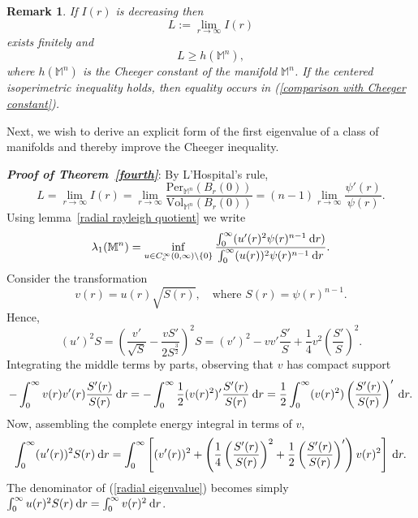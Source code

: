 \documentclass[a4paper,11pt,reqno]{amsart}
\renewcommand\eqref[1]{(\ref{#1})}
\theoremstyle{plain}
\newtheorem{remark}{Remark}[section]
\numberwithin{equation}{section} \allowdisplaybreaks
\newcommand{\m}{\mathbb{M}^n}
\newcommand{\dr}{\:{\rm d}r}
\begin{document}
\begin{remark}
\rm
    If $I(r)$ is decreasing then
    \begin{equation*}
        L:=\lim_{r \to \infty}I(r)
    \end{equation*}
    exists finitely and 
    \begin{equation}\label{comparison with Cheeger constant}
        L \geq h(\m),
    \end{equation}
    where $h(\m)$ is the Cheeger constant of the manifold $\m$. If the centered isoperimetric inequality holds, then equality occurs in \eqref{comparison with Cheeger constant}. \rm
\end{remark}

\medskip


Next, we wish to derive an explicit form of the first eigenvalue of a class of manifolds and thereby improve the Cheeger inequality. 


   \textit{\textbf{Proof of Theorem~\ref{fourth}}}: By L'Hospital's rule,
    \begin{equation*}
        L=\lim_{r \to \infty}I(r)=\lim_{r \to \infty}\frac{\text{Per}_{\m}(B_r(0))}{\text{Vol}_{\m}(B_r(0))}=(n-1)\lim_{r \to \infty}\frac{\psi'(r)}{\psi(r)}.
    \end{equation*}
Using lemma~\ref{radial rayleigh quotient} we write
\begin{equation}\label{radial eigenvalue}
    \lambda_1(\m)=\inf_{u\in C_c^{\infty}(0,\infty)\setminus \{0\}}\frac{\int_0^{\infty}(u'(r)^2\psi(r)^{n-1}\dr)}{\int_0^{\infty}(u(r))^2\psi(r)^{n-1}\dr}.
\end{equation}
Consider the transformation
\begin{equation*}
    v(r)=u(r)\sqrt{S(r)},\quad \text{where $S(r)=\psi(r)^{n-1}$}.
\end{equation*}
Hence,
\begin{equation*}
    (u')^2S=\left(\frac{v'}{\sqrt{S}}-\frac{vS'}{2S^{\frac{3}{2}}}\right)^2S=(v')^2-vv'\frac{S'}{S}+\frac{1}{4}v^2\left(\frac{S'}{S}\right)^2.
\end{equation*}
Integrating the middle terms by parts, observing that $v$ has compact support
\begin{equation*}
    -\int_0^{\infty}v(r)v'(r)\frac{S'(r)}{S(r)}\dr=-\int_0^{\infty}\frac{1}{2}(v(r)^2)'\frac{S'(r)}{S(r)}\dr=\frac{1}{2}\int_0^{\infty}(v(r)^2)\left(\frac{S'(r)}{S(r)}\right)'\dr.
\end{equation*}
    Now, assembling the complete energy integral in terms of $v$,
    \begin{equation*}
        \int_0^{\infty}(u'(r))^2S(r)\dr=\int_0^{\infty}\left[(v'(r))^2+\left(\frac{1}{4}\left(\frac{S'(r)}{S(r)}\right)^2+\frac{1}{2}\left(\frac{S'(r)}{S(r)}\right)'\right)v(r)^2\right]\dr.
    \end{equation*}
The denominator of \eqref{radial eigenvalue} becomes simply $\int_0^{\infty}u(r)^2S(r)\dr=\int_0^{\infty}v(r)^2\dr$.
\end{document}
